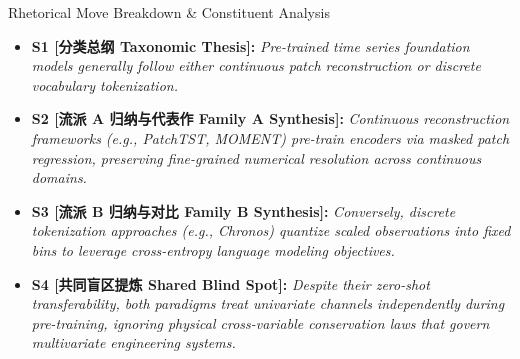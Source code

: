 \begin{TipBox}{Rhetorical Move Breakdown \& Constituent Analysis}
\begin{itemize}[leftmargin=1.5em]
  \item \textbf{S1 [分类总纲 Taxonomic Thesis]:} \textit{Pre-trained time series foundation models generally follow either continuous patch reconstruction or discrete vocabulary tokenization.}\par{}
  \item \textbf{S2 [流派 A 归纳与代表作 Family A Synthesis]:} \textit{Continuous reconstruction frameworks (e.g., PatchTST, MOMENT) pre-train encoders via masked patch regression, preserving fine-grained numerical resolution across continuous domains.}\par{}
  \item \textbf{S3 [流派 B 归纳与对比 Family B Synthesis]:} \textit{Conversely, discrete tokenization approaches (e.g., Chronos) quantize scaled observations into fixed bins to leverage cross-entropy language modeling objectives.}\par{}
  \item \textbf{S4 [共同盲区提炼 Shared Blind Spot]:} \textit{Despite their zero-shot transferability, both paradigms treat univariate channels independently during pre-training, ignoring physical cross-variable conservation laws that govern multivariate engineering systems.}\par{}
\end{itemize}
\end{TipBox}
\medskip
